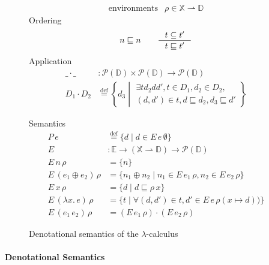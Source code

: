 \documentclass{tufte-handout}
\newcommand{\defeq}[0]{\overset{\mathrm{def}}{=}}
\newcommand{\LAM}[1]{\lambda #1.\,}
\newcommand{\pto}[0]{\rightharpoonup}
\newcommand{\VAR}[0]{\mathbb{X}}
\newcommand{\ext}[3]{#3(#1{\mapsto}#2)}
\begin{document}
\begin{figure*}[tbp]
  \begin{minipage}{0.5\textwidth}
\[
\begin{array}{lrl}
  \text{environments} & \rho \in  \VAR \pto \mathbb{D} 
\end{array}
\]
Ordering
\[
   n \sqsubseteq n \qquad 
   \inference{t \subseteq t'}{t \sqsubseteq t'}
\]
Application
\begin{align*}
  \_ \cdot \_ &: \mathcal{P}(\mathbb{D}) \times \mathcal{P}(\mathbb{D})\to \mathcal{P}(\mathbb{D}) \\
  D_1 \cdot D_2 & \defeq
    \left\{ d_3 \middle|
    \begin{array}{l}
      \exists t d_2 d d', t \in D_1,  d_2 \in D_2, \\
      (d,d') \in t, d \sqsubseteq d_2, d_3 \sqsubseteq d'
    \end{array}
    \right\}
\end{align*}
\end{minipage}
\begin{minipage}{0.5\textwidth}
Semantics
\begin{align*}
  P\,e &\defeq \{ d \mid d \in E\,e\,\emptyset\} \\[1ex]
  E & : \mathbb{E} \to (\VAR \pto \mathbb{D}) \to \mathcal{P}(\mathbb{D})\\
  E\, n \, \rho & = \{ n \} \\
  E\, (e_1 \oplus e_2) \, \rho & = \{ n_1 \oplus n_2 \mid n_1 \in E\,e_1\,\rho, 
                                    n_2 \in E\,e_2\,\rho \} \\
  E\, x \,\rho &= \{ d \mid d \sqsubseteq \rho\,x \} \\
  E\, (\LAM{x}e)\,\rho &= 
      \{ t \mid \forall (d,d') \in t, d' \in E\,e\,\ext{x}{ d}{\rho}) \} \\
  E\, (e_1\,e_2)\,\rho &= (E\,e_1\,\rho) \cdot (E\,e_2\,\rho)
\end{align*}
\end{minipage}
\caption{Denotational semantics of the $\lambda$-calculus}
\label{fig:lambda}
\end{figure*}


\paragraph{Denotational Semantics}
\end{document}
